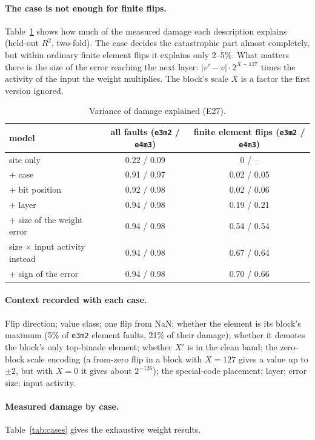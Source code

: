 \documentclass[10pt,a4paper]{article}
\newcommand{\fmt}[1]{\texttt{#1}}
\begin{document}
\paragraph{The case is not enough for finite flips.} Table~\ref{tab:r2} shows how much of the
measured damage each description explains (held-out $R^2$, two-fold). The case decides the
catastrophic part almost completely, but within ordinary finite element flips it explains only
2--5\%. What matters there is the size of the error reaching the next layer:
$|v'-v|\cdot 2^{X-127}$ times the activity of the input the weight multiplies. The block's
scale $X$ is a factor the first version ignored.

\begin{table}[h]
\centering
\caption{Variance of damage explained (E27).}
\label{tab:r2}
\begin{tabular}{lcc}
\toprule
model & all faults (\fmt{e3m2} / \fmt{e4m3}) & finite element flips (\fmt{e3m2} / \fmt{e4m3}) \\
\midrule
site only & 0.22 / 0.09 & 0 / -- \\
+ case & 0.91 / 0.97 & 0.02 / 0.05 \\
+ bit position & 0.92 / 0.98 & 0.02 / 0.06 \\
+ layer & 0.94 / 0.98 & 0.19 / 0.21 \\
+ size of the weight error & 0.94 / 0.98 & 0.54 / 0.54 \\
size $\times$ input activity instead & 0.94 / 0.98 & 0.67 / 0.64 \\
+ sign of the error & 0.94 / 0.98 & 0.70 / 0.66 \\
\bottomrule
\end{tabular}
\end{table}

\paragraph{Context recorded with each case.} Flip direction; value class; one flip from NaN;
whether the element is its block's maximum (5\% of \fmt{e3m2} element faults, 21\% of their
damage); whether it demotes the block's only top-binade element; whether $X'$ is in the clean
band; the zero-block scale encoding (a from-zero flip in a block with $X=127$ gives a value up to
$\pm2$, but with $X=0$ it gives about $2^{-126}$); the special-code placement; layer; error size;
input activity.

\paragraph{Measured damage by case.} Table~\ref{tab:cases} gives the exhaustive weight results.
\end{document}
